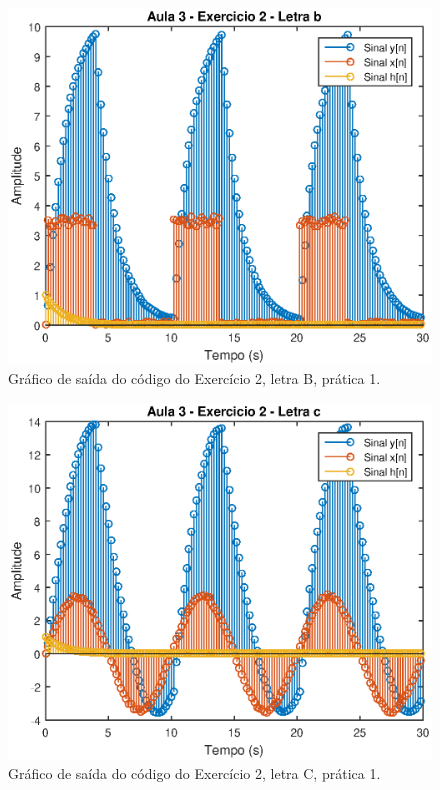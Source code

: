 \begin{figure}[!ht]
	\centering
    \includegraphics[scale = 1]{Imagens/Aula_3_exercicio2_LetraB.eps}
    \caption{Gráfico de saída do código do Exercício 2, letra B, prática 1.}
    \label{saida_ex2_pr_1_L_B}
\end{figure}

\begin{figure}[!ht]
	\centering
    \includegraphics[scale = 1]{Imagens/Aula_3_exercicio2_LetraC.eps}
    \caption{Gráfico de saída do código do Exercício 2, letra C, prática 1.}
    \label{saida_ex2_pr_1_L_C}
\end{figure}

